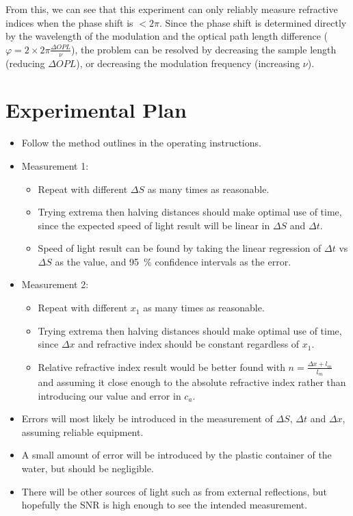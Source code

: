 \documentclass[a4paper]{scrartcl}
\begin{document}
From this, we can see that this experiment can only reliably measure refractive indices when the phase shift is \(< 2 \pi\). Since the phase shift is determined directly by the wavelength of the modulation and the optical path length difference (\(\varphi = 2 \times 2 \pi \frac{\Delta OPL}{\nu}\)), the problem can be resolved by decreasing the sample length (reducing \(\Delta OPL\)), or decreasing the modulation frequency (increasing \(\nu\)).

\section{Experimental Plan}
\begin{itemize}
    \item Follow the method outlines in the operating instructions.
    \item Measurement 1:
    \begin{itemize}
        \item Repeat with different \(\Delta S\) as many times as reasonable.
        \item Trying extrema then halving distances should make optimal use of time, since the expected speed of light result will be linear in \(\Delta S\) and \(\Delta t\).
        \item Speed of light result can be found by taking the linear regression of \(\Delta t\) vs \(\Delta S\) as the value, and \SI{95}{\percent} confidence intervals as the error.
    \end{itemize}
    \item Measurement 2:
    \begin{itemize}
        \item Repeat with different \(x_1\) as many times as reasonable.
        \item Trying extrema then halving distances should make optimal use of time, since \(\Delta x\) and refractive index should be constant regardless of \(x_1\).
        \item Relative refractive index result would be better found with \(n = \frac{\Delta x + l_m}{l_m}\) and assuming it close enough to the absolute refractive index rather than introducing our value and error in \(c_a\).
    \end{itemize}
    \item Errors will most likely be introduced in the measurement of \(\Delta S\), \(\Delta t\) and \(\Delta x\), assuming reliable equipment.
    \item A small amount of error will be introduced by the plastic container of the water, but should be negligible.
    \item There will be other sources of light such as from external reflections, but hopefully the SNR is high enough to see the intended measurement.
\end{itemize}
\end{document}
